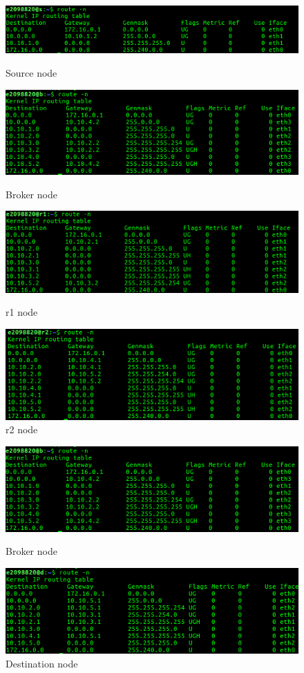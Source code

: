 \documentclass[conference]{IEEEtran}
\begin{document}
\begin{figure}[ht]
  \includegraphics[width=\linewidth]{s.png}
  \caption{Source node}
  \label{fig:boat1}
    \includegraphics[width=\linewidth]{b.png}
  \caption{Broker node}
  \label{fig:boat1}
    \includegraphics[width=\linewidth]{r1.png}
  \caption{r1 node}
  \label{fig:boat1}
    \includegraphics[width=\linewidth]{r2.png}
  \caption{r2 node}
  \label{fig:boat1}
\end{figure}
\begin{figure}[ht]
  \includegraphics[width=\linewidth]{b.png}
  \caption{Broker node}
  \label{fig:boat1}
    \includegraphics[width=\linewidth]{d.png}
  \caption{Destination node}
  \label{fig:boat1}
\end{figure}
\\
\\
\\
\\
\end{document}
